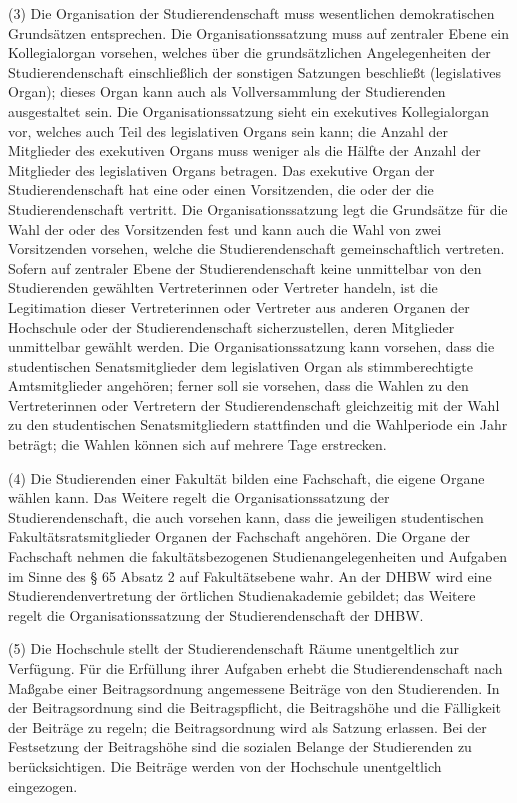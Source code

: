 \documentclass[
10pt,
a4paper,
twoside,								%
titlepage=false,							%
draft=false								%
]{scrartcl}
\begin{document}
(3) Die Organisation der Studierendenschaft muss wesentlichen demokratischen Grundsätzen entsprechen. Die Organisationssatzung muss auf zentraler Ebene ein Kollegialorgan vorsehen, welches über die grundsätzlichen Angelegenheiten der Studierendenschaft einschließlich der sonstigen Satzungen beschließt (legislatives Organ); dieses Organ kann auch als Vollversammlung der Studierenden ausgestaltet sein. Die Organisationssatzung sieht ein exekutives Kollegialorgan vor, welches auch Teil des legislativen Organs sein kann; die Anzahl der Mitglieder des exekutiven Organs muss weniger als die Hälfte der Anzahl der Mitglieder des legislativen Organs betragen. Das exekutive Organ der Studierendenschaft hat eine oder einen Vorsitzenden, die oder der die Studierendenschaft vertritt. Die Organisationssatzung legt die Grundsätze für die Wahl der oder des Vorsitzenden fest und kann auch die Wahl von zwei Vorsitzenden vorsehen, welche die Studierendenschaft gemeinschaftlich vertreten. Sofern auf zentraler Ebene der Studierendenschaft keine unmittelbar von den Studierenden gewählten Vertreterinnen oder Vertreter handeln, ist die Legitimation dieser Vertreterinnen oder Vertreter aus anderen Organen der Hochschule oder der Studierendenschaft sicherzustellen, deren Mitglieder unmittelbar gewählt werden. Die Organisationssatzung kann vorsehen, dass die studentischen Senatsmitglieder dem legislativen Organ als stimmberechtigte Amtsmitglieder angehören; ferner soll sie vorsehen, dass die Wahlen zu den Vertreterinnen oder Vertretern der Studierendenschaft gleichzeitig mit der Wahl zu den studentischen Senatsmitgliedern stattfinden und die Wahlperiode ein Jahr beträgt; die Wahlen können sich auf mehrere Tage erstrecken.

(4) Die Studierenden einer Fakultät bilden eine Fachschaft, die eigene Organe wählen kann. Das Weitere regelt die Organisationssatzung der Studierendenschaft, die auch vorsehen kann, dass die jeweiligen studentischen Fakultätsratsmitglieder Organen der Fachschaft angehören. Die Organe der Fachschaft nehmen die fakultätsbezogenen Studienangelegenheiten und Aufgaben im Sinne des § 65 Absatz 2 auf Fakultätsebene wahr. An der DHBW wird eine Studierendenvertretung der örtlichen Studienakademie gebildet; das Weitere regelt die Organisationssatzung der Studierendenschaft der DHBW.

(5) Die Hochschule stellt der Studierendenschaft Räume unentgeltlich zur Verfügung. Für die Erfüllung ihrer Aufgaben erhebt die Studierendenschaft nach Maßgabe einer Beitragsordnung angemessene Beiträge von den Studierenden. In der Beitragsordnung sind die Beitragspflicht, die Beitragshöhe und die Fälligkeit der Beiträge zu regeln; die Beitragsordnung wird als Satzung erlassen. Bei der Festsetzung der Beitragshöhe sind die sozialen Belange der Studierenden zu berücksichtigen. Die Beiträge werden von der Hochschule unentgeltlich eingezogen.
\end{document}
